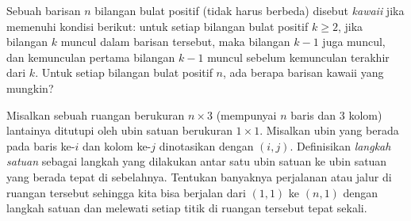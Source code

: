 \documentclass[11pt]{scrartcl}
\begin{document}
\begin{soaljawab}
    Sebuah barisan $n$ bilangan bulat positif (tidak harus berbeda) disebut \textit{kawaii} jika memenuhi kondisi berikut: untuk setiap bilangan bulat positif $k \ge 2$, jika bilangan $k$ muncul dalam barisan tersebut, maka bilangan $k-1$ juga muncul, dan kemunculan pertama bilangan $k-1$ muncul sebelum kemunculan terakhir dari $k$. Untuk setiap bilangan bulat positif $n$, ada berapa barisan kawaii yang mungkin?
\end{soaljawab}

\begin{soaljawab}
    Misalkan sebuah ruangan berukuran $n \times 3$ (mempunyai $n$ baris dan $3$ kolom) lantainya ditutupi oleh ubin satuan berukuran $1 \times 1$. Misalkan ubin yang berada pada baris ke-$i$ dan kolom ke-$j$ dinotasikan dengan $(i,j)$. Definisikan \textit{langkah satuan} sebagai langkah yang dilakukan antar satu ubin satuan ke ubin satuan yang berada tepat di sebelahnya. Tentukan banyaknya perjalanan atau jalur di ruangan tersebut sehingga kita bisa berjalan dari $(1,1)$ ke $(n,1)$ dengan langkah satuan dan melewati setiap titik di ruangan tersebut tepat sekali.
\end{soaljawab}
\end{document}
